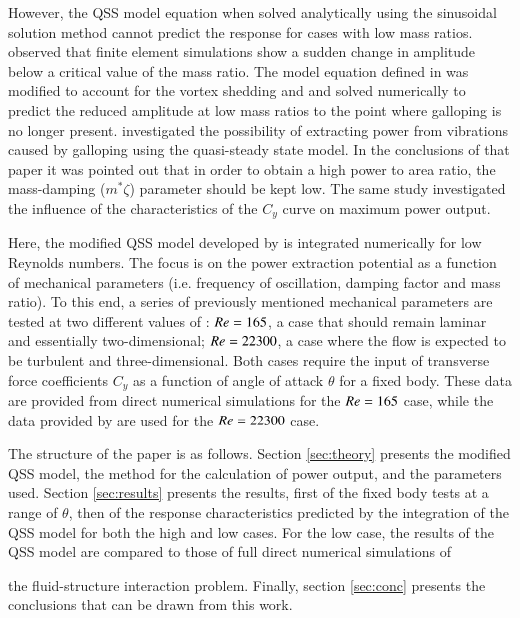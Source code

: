 However, the QSS model equation when solved analytically using the sinusoidal solution method cannot predict the response for cases with low mass ratios. \citet{Joly2012} observed that finite element simulations show a sudden change in amplitude below a critical value of the mass ratio. The model equation defined in \citet{Parkinson1964} was modified to account for the vortex shedding and and solved numerically to predict the reduced amplitude at low mass ratios to the point where galloping is no longer present. \citet{Barrero-Gil2010a} investigated the possibility of extracting power from vibrations caused by galloping using the quasi-steady state model. In the conclusions of that paper it was pointed out that in order to obtain a high power to area ratio, the mass-damping ($m^*\zeta$) parameter should be kept low. The same study investigated the influence of the characteristics of the $C_y$ curve on maximum power output.

Here, the modified QSS model developed by \citet{Joly2012} is integrated numerically for low Reynolds numbers. The focus is on the power extraction potential as a function of mechanical parameters (i.e. frequency of oscillation, damping factor and mass ratio). To this end, a series of previously mentioned mechanical parameters are tested at two different values of \reynoldsnumber: $Re = 165$, a case that should remain laminar and essentially two-dimensional; $Re = 22300$, a case where the flow is expected to be turbulent and three-dimensional. Both cases require the input of transverse force coefficients $C_y$ as a function of angle of attack $\theta$ for a fixed body. These data are provided from direct numerical simulations for the $Re = 165$ case, while the data provided by \citet{Parkinson1964} are used for the $Re = 22300$ case.

The structure of the paper is as follows. Section \ref{sec:theory} presents the modified QSS model, the method for the calculation of power output, and the parameters used. Section \ref{sec:results} presents the results, first of the fixed body tests at a range of $\theta$, then of the response characteristics predicted by the integration of the QSS model for both the high and low \reynoldsnumber cases. For the low \reynoldsnumber case, the results of the QSS model are compared to those of full direct numerical simulations of  



the fluid-structure interaction problem. Finally, section \ref{sec:conc} presents the conclusions that can be drawn from this work.
